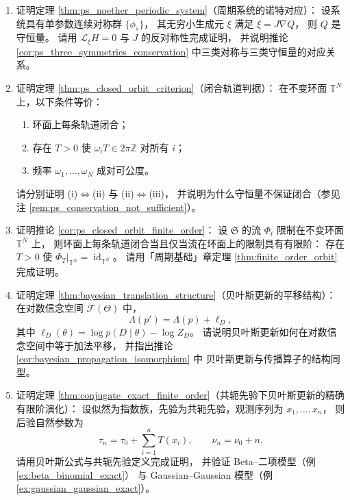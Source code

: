 \begin{enumerate}[leftmargin=3em, label=\textbf{题 \arabic*}]
    \item 证明定理 \ref{thm:ps_noether_periodic_system}（周期系统的诺特对应）：
    设系统具有单参数连续对称群 $\{\phi_s\}$，
    其无穷小生成元 $\xi$ 满足 $\xi=J\nabla Q$，
    则 $Q$ 是守恒量。
    请用 $\mathcal{L}_\xi H=0$ 与 $J$ 的反对称性完成证明，
    并说明推论 \ref{cor:ps_three_symmetries_conservation}
    中三类对称与三类守恒量的对应关系。

    \item 证明定理 \ref{thm:ps_closed_orbit_criterion}（闭合轨道判据）：
    在不变环面 $\mathbb{T}^N$ 上，以下条件等价：
    \begin{enumerate}[label=(\roman*)]
        \item 环面上每条轨道闭合；
        \item 存在 $T>0$ 使 $\omega_iT\in2\pi\mathbb{Z}$ 对所有 $i$；
        \item 频率 $\omega_1,\dots,\omega_N$ 成对可公度。
    \end{enumerate}
    请分别证明 (i)$\Leftrightarrow$(ii) 与 (ii)$\Leftrightarrow$(iii)，
    并说明为什么守恒量不保证闭合（参见注 \ref{rem:ps_conservation_not_sufficient}）。

    \item 证明推论 \ref{cor:ps_closed_orbit_finite_order}：
    设 $\mathfrak{S}$ 的流 $\Phi_t$ 限制在不变环面 $\mathbb{T}^N$ 上，
    则环面上每条轨道闭合当且仅当流在环面上的限制具有有限阶：
    存在 $T>0$ 使 $\Phi_T|_{\mathbb{T}^N}=\operatorname{id}_{\mathbb{T}^N}$。
    请用「周期基础」章定理 \ref{thm:finite_order_orbit} 完成证明。

    \item 证明定理 \ref{thm:bayesian_translation_structure}（贝叶斯更新的平移结构）：
    在对数信念空间 $\mathcal{F}(\Theta)$ 中，
    \[
    \Lambda(p')=\Lambda(p)+\ell_D,
    \]
    其中 $\ell_D(\theta)=\log p(D\mid\theta)-\log Z_D$。
    请说明贝叶斯更新如何在对数信念空间中等于加法平移，
    并指出推论 \ref{cor:bayesian_propagation_isomorphism} 中
    贝叶斯更新与传播算子的结构同型。

    \item 证明定理 \ref{thm:conjugate_exact_finite_order}（共轭先验下贝叶斯更新的精确有限阶演化）：
    设似然为指数族，先验为共轭先验，观测序列为 $x_1,\dots,x_n$，
    则后验自然参数为
    \[
    \tau_n=\tau_0+\sum_{i=1}^nT(x_i),\qquad
    \nu_n=\nu_0+n.
    \]
    请用贝叶斯公式与共轭先验定义完成证明，
    并验证 Beta--二项模型（例 \ref{ex:beta_binomial_exact}）
    与 Gaussian--Gaussian 模型（例 \ref{ex:gaussian_gaussian_exact}）。


\end{enumerate}
